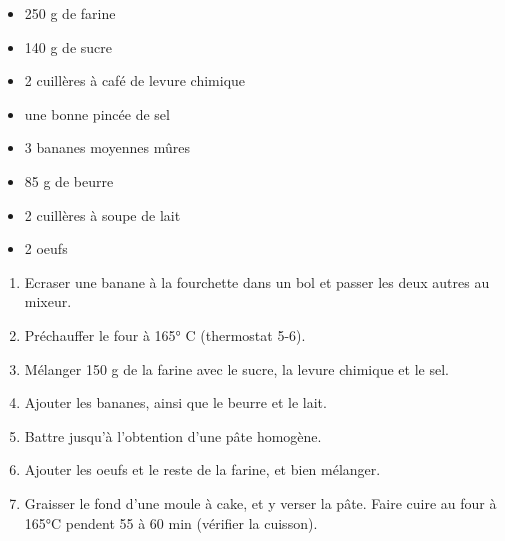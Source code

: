 \bigskip
{}
{}{\begin{itemize}
	\item 250 g de farine
	\item 140 g de sucre
	\item 2 cuillères à café de levure chimique
	\item une bonne pincée de sel
	\item 3 bananes moyennes mûres
	\item 85 g de beurre
	\item 2 cuillères à soupe de lait
	\item 2 oeufs
\end{itemize}}
{\phantom{.}

\medskip
\begin{enumerate}
	\item Ecraser une banane à la fourchette dans un bol et passer les deux autres au mixeur.
	\item Préchauffer le four à 165° C (thermostat 5-6).
	\item Mélanger 150 g de la farine avec le sucre, la levure chimique et le sel.
	\item Ajouter les bananes, ainsi que le beurre et le lait.
	\item Battre jusqu'à l'obtention d'une pâte homogène.
	\item Ajouter les oeufs et le reste de la farine, et bien mélanger.
	\item Graisser le fond d'une moule à cake, et y verser la pâte. Faire cuire au four à 165°C pendent 55 à 60 min (vérifier la cuisson).
\end{enumerate}

\medskip
\phantom{.}}

